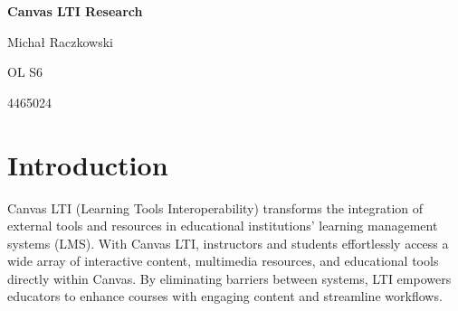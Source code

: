 \documentclass[a4paper, 11pt]{article}
\begin{document}
\begin{titlepage}
	\setlength{\parindent}{0pt}
	\vspace*{.15\textheight}
	\medbreak
	{\Huge\bfseries\color{MSBlue} Canvas LTI Research\par}
	\bigbreak
    \bigbreak
	{Michał Raczkowski\par}
    \smallbreak
    {\small OL S6\par}
    \smallbreak
    {\small 4465024\par}
\end{titlepage}

\pagebreak

\tableofcontents

\pagebreak


\section{Introduction}
Canvas LTI (Learning Tools Interoperability) transforms the integration of external tools and resources in educational institutions' learning management systems (LMS). With Canvas LTI, instructors and students effortlessly access a wide array of interactive content, multimedia resources, and educational tools directly within Canvas. By eliminating barriers between systems, LTI empowers educators to enhance courses with engaging content and streamline workflows. 
\end{document}

